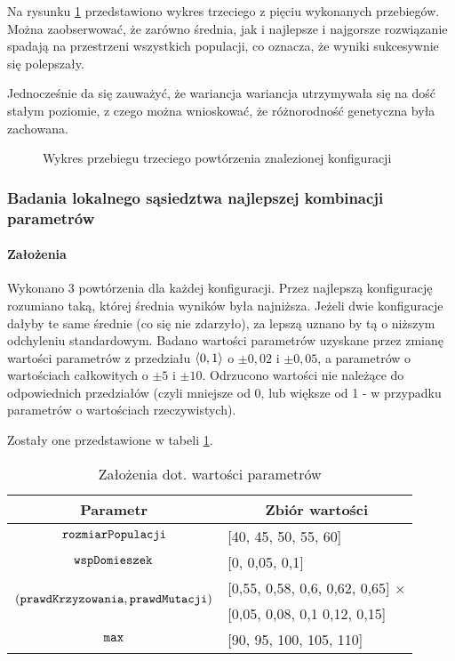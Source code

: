\documentclass[./FM_mgr.tex]{subfiles}
\begin{document}
Na rysunku \ref{figure:tsp_init_example} przedstawiono wykres trzeciego z pięciu wykonanych przebiegów.
Można zaobserwować, że zarówno średnia, jak i najlepsze i najgorsze rozwiązanie spadają na przestrzeni wszystkich populacji, co oznacza, że wyniki sukcesywnie się polepszały.

Jednocześnie da się zauważyć, że wariancja wariancja utrzymywała się na dość stałym poziomie, z czego można wnioskować, że różnorodność genetyczna była zachowana.

\begin{figure}[H]
	\centering
	\caption{Wykres przebiegu trzeciego powtórzenia znalezionej konfiguracji \label{figure:tsp_init_example}}
\end{figure}

\subsubsection{Badania lokalnego sąsiedztwa najlepszej kombinacji parametrów}

\paragraph{Założenia} Wykonano 3 powtórzenia dla każdej konfiguracji.
Przez najlepszą konfigurację rozumiano taką, której średnia wyników była najniższa.
Jeżeli dwie konfiguracje dałyby te same średnie (co się nie zdarzyło), za lepszą uznano by tą o niższym odchyleniu standardowym.
Badano wartości parametrów uzyskane przez zmianę wartości parametrów z przedziału $\langle0, 1\rangle$ o $\pm0,02$ i $\pm0,05$, a parametrów o wartościach całkowitych o $\pm5$ i $\pm10$. 
Odrzucono wartości nie należące do odpowiednich przedziałów (czyli mniejsze od 0, lub większe od 1 - w przypadku parametrów o wartościach rzeczywistych).

Zostały one przedstawione w tabeli \ref{config:tsp_tweak_params}.

\begin{table}
	\caption{Założenia dot. wartości parametrów \label{config:tsp_tweak_params}}
	\centering
	\begin{tabular}{|c|l|}
		\hline
		\textbf{Parametr} & \multicolumn{1}{c|}{\textbf{Zbiór wartości}} \\
		\hline
		\hline
		$\mathtt{rozmiarPopulacji}$ & [40, 45, 50, 55, 60] \\
		\hline
		$\mathtt{wspDomieszek}$ & [0, 0,05, 0,1]\\
		\hline
		\multirow{2}{*}{$(\mathtt{prawdKrzyzowania}, \mathtt{prawdMutacji})$} & [0,55, 0,58, 0,6, 0,62, 0,65] $\times$ \\
		& [0,05, 0,08, 0,1 0,12, 0,15]  \\
		\hline
		$\mathtt{max}$ & [90, 95, 100, 105, 110] \\
		\hline		
	\end{tabular}
\end{table}
\end{document}
